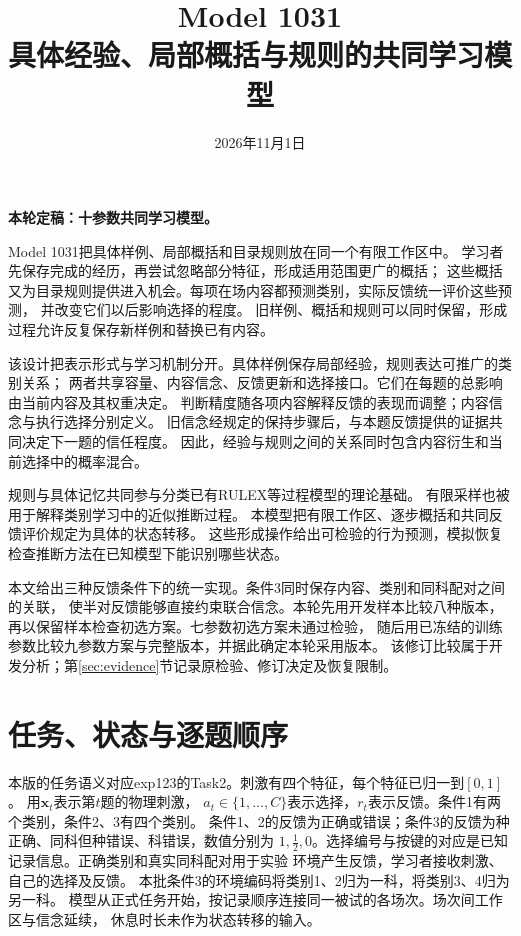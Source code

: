 \documentclass[11pt,a4paper]{article}
\title{Model 1031\\[0.4em]\Large 具体经验、局部概括与规则的共同学习模型}
\author{}\date{2026年11月1日}
\numberwithin{equation}{section}
\begin{document}
\maketitle
\thispagestyle{empty}

\noindent\textbf{本轮定稿：十参数共同学习模型。}

Model 1031把具体样例、局部概括和目录规则放在同一个有限工作区中。
学习者先保存完成的经历，再尝试忽略部分特征，形成适用范围更广的概括；
这些概括又为目录规则提供进入机会。每项在场内容都预测类别，实际反馈统一评价这些预测，
并改变它们以后影响选择的程度。
旧样例、概括和规则可以同时保留，形成过程允许反复保存新样例和替换已有内容。

该设计把表示形式与学习机制分开。具体样例保存局部经验，规则表达可推广的类别关系；
两者共享容量、内容信念、反馈更新和选择接口。它们在每题的总影响由当前内容及其权重决定。
判断精度随各项内容解释反馈的表现而调整；内容信念与执行选择分别定义。
旧信念经规定的保持步骤后，与本题反馈提供的证据共同决定下一题的信任程度。
因此，经验与规则之间的关系同时包含内容衍生和当前选择中的概率混合。

规则与具体记忆共同参与分类已有RULEX等过程模型的理论基础\cite{nosofsky1994}。
有限采样也被用于解释类别学习中的近似推断过程\cite{sanborn2010}。
本模型把有限工作区、逐步概括和共同反馈评价规定为具体的状态转移。
这些形成操作给出可检验的行为预测，模拟恢复检查推断方法在已知模型下能识别哪些状态。

本文给出三种反馈条件下的统一实现。条件3同时保存内容、类别和同科配对之间的关联，
使半对反馈能够直接约束联合信念。本轮先用开发样本比较八种版本，再以保留样本检查初选方案。七参数初选方案未通过检验，
随后用已冻结的训练参数比较九参数方案与完整版本，并据此确定本轮采用版本。
该修订比较属于开发分析；第\ref{sec:evidence}节记录原检验、修订决定及恢复限制。

{\small\setlength{\parskip}{0pt}\tableofcontents}
\clearpage
\section{任务、状态与逐题顺序}
\label{sec:state}

本版的任务语义对应exp123的Task2。刺激有四个特征，每个特征已归一到$[0,1]$。
用$\bm x_t$表示第$t$题的物理刺激，
$a_t\in\{1,\ldots,C\}$表示选择，$r_t$表示反馈。条件1有两个类别，条件2、3有四个类别。
条件1、2的反馈为正确或错误；条件3的反馈为种正确、同科但种错误、科错误，数值分别为
$1,\tfrac12,0$。选择编号与按键的对应是已知记录信息。正确类别和真实同科配对用于实验
环境产生反馈，学习者接收刺激、自己的选择及反馈。
本批条件3的环境编码将类别1、2归为一科，将类别3、4归为另一科。
模型从正式任务开始，按记录顺序连接同一被试的各场次。场次间工作区与信念延续，
休息时长未作为状态转移的输入。
\end{document}
